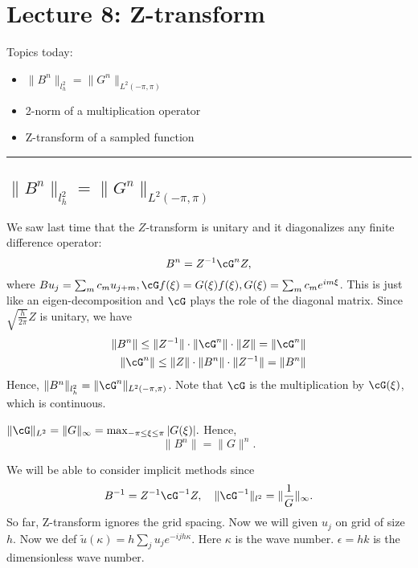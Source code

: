 \newpage 
\section{Lecture 8: Z-transform} 
Topics today: 
\begin{itemize}
    \item $ \|B^n\|_{l_h^2} = \|G^n\|_{L^2(-\pi, \pi)} $
    \item 2-norm of a multiplication operator 
    \item Z-transform of a sampled function  
\end{itemize}

\vspace{1em}
\hrule 
\vspace{1em} 

\subsection{$ \|B^n\|_{l_h^2} = \|G^n\|_{L^2(-\pi, \pi)} $}
We saw last time that the $Z$-transform is unitary and it diagonalizes any finite difference operator: 
\[
    B^n = Z^{-1}\cG^n Z,
\] 
where $  Bu_j = \sum_{m} c_m u_{j+m}, \cG f(\xi) = G(\xi) f(\xi), G(\xi) = \sum_{m} c_m e^{im\xi}$.  This is just like an eigen-decomposition and $\cG$ plays the role of the diagonal matrix. Since $\sqrt{\frac{h}{2\pi}} Z$ is unitary, we have 
\begin{align*}
    \|B^n\| \le  \|Z^{-1}\| \cdot  \|\cG^n\| \cdot \|Z\| = \|\cG^n\| \\ 
    \|\cG^n\| \le \|Z\| \cdot \|B^n\| \cdot \|Z^{-1}\| = \|B^n\|
\end{align*}  
Hence, $\|B^n\|_{l_h^2} = \|\cG^n\|_{L^2(-\pi, \pi)}$.  Note that $\cG$ is the multiplication by $\cG(\xi)$, which is continuous. 


\begin{proposition}
\label{prop: Amplification factor}
$\|\cG\|_{L^2} = \|G\|_\infty  = \max_{-\pi \le \xi \le \pi} |G(\xi)|.$ Hence, 
\[
    \|B^n\| = \|G\|^n. 
\]
\end{proposition}

We will be able to consider implicit methods since 
\[
    B^{-1} = Z^{-1} \cG^{-1} Z, \quad \|\cG^{-1}\|_{l^2} = \|\frac{1}{G}\|_{\infty}. 
\]
So far, Z-transform ignores the grid spacing. Now we will given $u_j$ on grid of size $h$. Now we def $\tilde u(\kappa) = h\sum_j u_j e^{-ijh \kappa }$.  Here $ \kappa $ is the wave number.  $\epsilon  = hk$ is the dimensionless wave number.  


